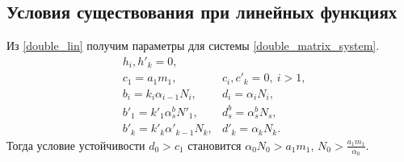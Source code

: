 \subsection{Условия существования при линейных функциях}
Из \eqref{double_lin} получим параметры для системы \eqref{double_matrix_system}.
\begin{equation}
    \begin{split}
        & h_i, h'_k = 0, \\
        & c_1 = a_1 m_1, & c_i, c'_k = 0, ~ i>1,  \\
        & b_i = k_i \alpha_{i-1} N_{i}, & d_i = \alpha_i N_{i}, \\
        & b'_1 = k'_1 \alpha^b_s N'_1, & d^b_s = \alpha^b_s N_s, \\
        & b'_k = k'_k \alpha'_{k-1} N_{k}, & d'_k = \alpha_k N_{k}.
    \end{split}
\end{equation}
Тогда условие устойчивости \(d_0 > c_1\) становится \(\alpha_0 N_{0} > a_1 m_1\), \( N_0 > \frac{a_1 m_1}{\alpha_0}\).

